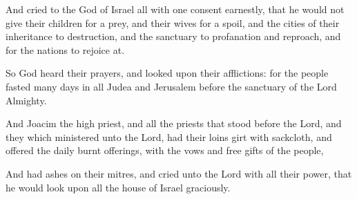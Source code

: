 {\par }{\PP {}And cried to the God of Israel all with one consent earnestly, that he would not give their children for a prey, and their wives for a spoil, and the cities of their inheritance to destruction, and the sanctuary to profanation and reproach, and for the nations to rejoice at.
\par }{\PP {}So God heard their prayers, and looked upon their afflictions: for the people fasted many days in all Judea and Jerusalem before the sanctuary of the Lord Almighty.
\par }{\PP {}And Joacim the high priest, and all the priests that stood before the Lord, and they which ministered unto the Lord, had their loins girt with sackcloth, and offered the daily burnt offerings, with the vows and free gifts of the people,
\par }{\PP {}And had ashes on their mitres, and cried unto the Lord with all their power, that he would look upon all the house of Israel graciously.

}
